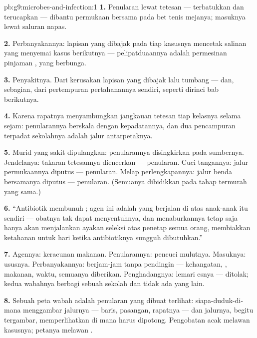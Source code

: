 \begin{solution}{pb:g9:microbes-and-infection:1}
\textbf{1.} Penularan lewat tetesan --- terbatukkan dan
terucapkan --- dibantu permukaan bersama pada bet tenis
mejanya; masuknya lewat saluran napas.

\textbf{2.} Perbanyakannya:  lapisan yang dibajak pada
tiap kasusnya mencetak salinan yang menyemai kasus
berikutnya --- pelipatduaannya adalah permesinan pinjaman
, yang berbunga.

\textbf{3.} Penyakitnya. Dari kerusakan  lapisan yang
dibajak lalu tumbang --- dan, sebagian, dari pertempuran
pertahanannya sendiri, seperti dirinci bab berikutnya.

\textbf{4.} Karena rapatnya menyambungkan jangkauan tetesan
tiap kelasnya selama sejam: penularannya berskala dengan
kepadatannya, dan dua pencampuran terpadat sekolahnya adalah
jalur antarpetaknya.

\textbf{5.} Murid yang sakit dipulangkan: penularannya
disingkirkan pada sumbernya. Jendelanya: takaran tetesannya
diencerkan --- penularan. Cuci tangannya: jalur permukaannya
diputus --- penularan. Melap perlengkapannya: jalur benda
bersamanya diputus --- penularan. (Semuanya dibidikkan pada
tahap termurah yang sama.)

\textbf{6.} ``Antibiotik membunuh ; agen ini adalah
 yang berjalan di atas  anak-anak itu sendiri ---
obatnya tak dapat menyentuhnya, dan menaburkannya tetap saja
hanya akan menjalankan ayakan seleksi atas  penetap
semua orang, membiakkan ketahanan untuk hari ketika
antibiotiknya sungguh dibutuhkan.''

\textbf{7.} Agennya:  keracunan makanan.
Penularannya: pencuci mulutnya. Masuknya: ususnya.
Perbanyakannya: berjam-jam tanpa pendingin --- kehangatan,
, makanan, waktu, semuanya diberikan. Penghadangnya:
lemari esnya ---  ditolak; kedua wabahnya berbagi
sebuah sekolah dan tidak ada yang lain.

\textbf{8.} Sebuah peta wabah adalah penularan yang dibuat
terlihat: siapa-duduk-di-mana menggambar jalurnya --- baris,
pasangan, rapatnya --- dan jalurnya, begitu tergambar,
memperlihatkan di mana harus dipotong. Pengobatan acak
melawan kasusnya; petanya melawan .


\end{solution}
